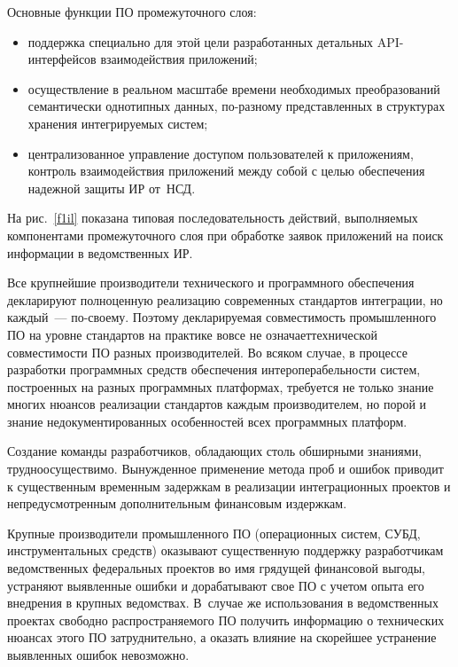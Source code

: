 \begin{multicols}{2}
      
      Основные функции ПО промежуточного слоя:
      \begin{itemize}
\item поддержка специально для этой цели разработанных детальных API-ин\-тер\-фей\-сов 
взаимодействия приложений;\\[-14pt]
\item  осуществление в реальном масштабе времени необходимых преобразований 
семантически однотипных данных, по-разному пред\-став\-лен\-ных в структурах хранения 
интегрируемых систем;\\[-14pt]
\item  централизованное управление доступом пользователей к приложениям, контроль 
взаимодействия приложений между собой с целью обеспечения надежной защиты 
ИР от~НСД.
\end{itemize}


      На рис.~\ref{f1il} показана типовая последовательность действий, выполняемых 
компонентами промежуточного слоя при обработке заявок приложений на поиск информации 
в ведомственных ИР. 
      
      Все крупнейшие производители технического и программного обеспечения 
декларируют полноценную реализацию современных стандартов интеграции, но каждый~--- 
по-своему. Поэтому декларируемая совместимость промышленного ПО на уровне стандартов на 
практике вовсе не означает\linebreak технической совместимости ПО разных производителей. Во 
всяком случае, в процессе разработки программных средств обеспечения 
ин\-тер\-опе\-ра\-бельности систем, построенных на разных\linebreak
программных платформах, требуется не 
только знание многих нюансов реализации стандартов каж\-дым производителем, но порой и 
знание недокументированных особенностей всех программных платформ. 

Создание команды 
разработчиков, обладающих столь обширными знаниями, трудноосуществимо. Вынужденное 
применение метода проб и ошибок приводит к существенным временным задержкам в 
реализации интеграционных проектов и непредусмотренным дополнительным финансовым 
издержкам.
      
       Крупные производители промышленного ПО (операционных систем, СУБД, 
инструментальных средств) оказывают существенную поддержку разработчикам 
ведомственных федеральных проектов во имя грядущей финансовой выгоды, устраняют 
выявленные ошибки и дорабатывают свое ПО с учетом опыта его внедрения в крупных 
ведомствах. В~случае же использования в ведомственных проектах свободно 
распространяемого ПО получить информацию о технических нюансах этого ПО 
затруднительно, а оказать влияние на скорейшее устранение выявленных ошибок невозможно.
      

\end{multicols}
